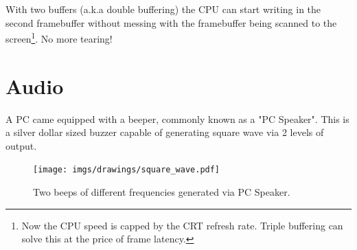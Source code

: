\documentclass[book.tex]{subfiles}
\begin{document}
\par
With two buffers (a.k.a double buffering) the CPU can start writing in the second framebuffer without messing with the framebuffer being scanned to the screen\footnote{Now the CPU speed is capped by the CRT refresh rate. Triple buffering can solve this at the price of frame latency.}. No more tearing!
















\section{Audio}
A PC came equipped with a beeper, commonly known as a "PC Speaker". This is a silver dollar sized buzzer capable of generating square wave via 2 levels of output.\\
\par
 \begin{figure}[H]
\centering
\texttt{[image: imgs/drawings/square\_wave.pdf]}
\caption{Two beeps of different frequencies generated via PC Speaker.}
\end{figure}
\end{document}
